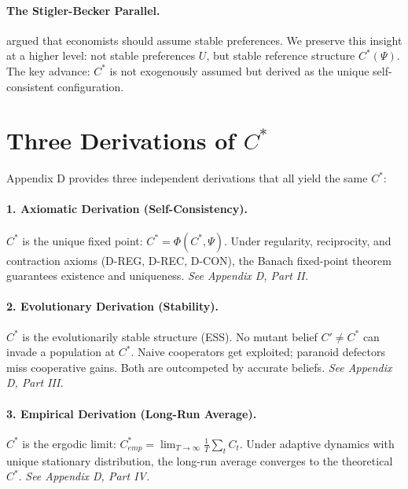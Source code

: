 \paragraph{The Stigler-Becker Parallel.}
\citet{stiglerbecker1977} argued that economists should assume stable preferences.
We preserve this insight at a higher level: not stable preferences $U$, but stable
reference structure $C^*(\Psi)$. The key advance: $C^*$ is not exogenously assumed
but derived as the unique self-consistent configuration.



\section{Three Derivations of $C^*$}
\label{sec:cstar-derivations}

Appendix D provides three independent derivations that all yield the same $C^*$:

\paragraph{1. Axiomatic Derivation (Self-Consistency).}
$C^*$ is the unique fixed point: $C^* = \Phi(C^*, \Psi)$. Under regularity,
reciprocity, and contraction axioms (D-REG, D-REC, D-CON), the Banach
fixed-point theorem guarantees existence and uniqueness.
\emph{See Appendix D, Part II.}

\paragraph{2. Evolutionary Derivation (Stability).}
$C^*$ is the evolutionarily stable structure (ESS). No mutant belief $C' \neq C^*$
can invade a population at $C^*$. Naive cooperators get exploited; paranoid
defectors miss cooperative gains. Both are outcompeted by accurate beliefs.
\emph{See Appendix D, Part III.}

\paragraph{3. Empirical Derivation (Long-Run Average).}
$C^*$ is the ergodic limit: $C^*_{emp} = \lim_{T\to\infty} \frac{1}{T}\sum_t C_t$.
Under adaptive dynamics with unique stationary distribution, the long-run
average converges to the theoretical $C^*$.
\emph{See Appendix D, Part IV.}

